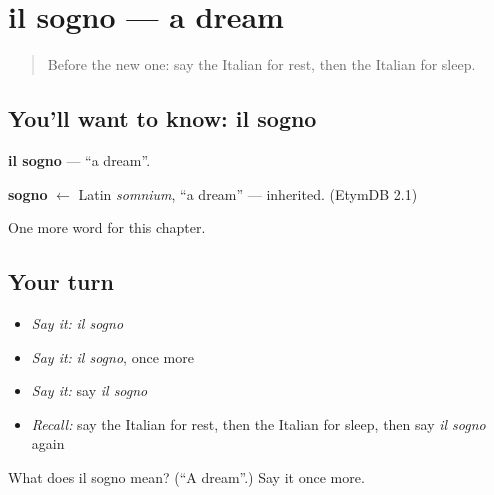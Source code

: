 \section[il sogno]{il sogno — a dream}

\label{lesson:IT-C152-sogno}



\begin{quote}
Before the new one: say the Italian for rest, then the Italian for sleep.
\end{quote}

\subsection*{You'll want to know: il sogno}
\textbf{il sogno} — \textquotedblleft{}a dream\textquotedblright{}.

\begin{cousinweb}
\textbf{sogno} $\leftarrow$ Latin \emph{somnium}, \textquotedblleft{}a dream\textquotedblright{} — inherited. (EtymDB 2.1)
\end{cousinweb}

\begin{grammarlens}[title={What you've built}]
One more word for this chapter.
\end{grammarlens}

\subsection*{Your turn}
\begin{itemize}
\raggedright
  \item \emph{Say it:} \emph{il sogno}
  \item \emph{Say it:} \emph{il sogno}, once more
  \item \emph{Say it:} say \emph{il sogno}
  \item \emph{Recall:} say the Italian for rest, then the Italian for sleep, then say \emph{il sogno} again
\end{itemize}

\begin{tcolorbox}[breakable,colback=teal!4,colframe=teal!35!black,title={Before you move on}]
What does il sogno mean? (\textquotedblleft{}A dream\textquotedblright{}.) Say it once more.
\end{tcolorbox}
